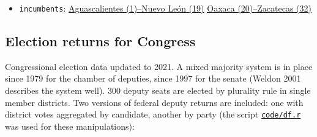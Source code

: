 \documentclass[11pt]{article}
\begin{document}
\begin{itemize}
\begin{itemize}
\item \texttt{incumbents}: \href{https://docs.google.com/spreadsheets/d/1lgJJ2f8O\_MHe18q3OekRylgxOXpKGrcm6ABQPVhmlf4/copy}{Aguascalientes (1)--Nuevo León (19)} \href{https://docs.google.com/spreadsheets/d/1ZabVHORN0uOU8AX7bZGiQY1JEhncG6SodLfn6DXW4zQ/copy}{Oaxaca (20)--Zacatecas (32)}
\end{itemize}
\end{itemize}
\subsection{Election returns for Congress}
\label{sec:orgf93a65d}
Congressional election data updated to 2021. A mixed majority system is in place since 1979 for the chamber of deputies, since 1997 for the senate (Weldon 2001 describes the system well). 300 deputy seats are elected by plurality rule in single member districts. Two versions of federal deputy returns are included: one with district votes aggregated by candidate, another by party (the script \href{./code/ay.r}{\texttt{code/df.r}} was used for these manipulations):
\end{document}
